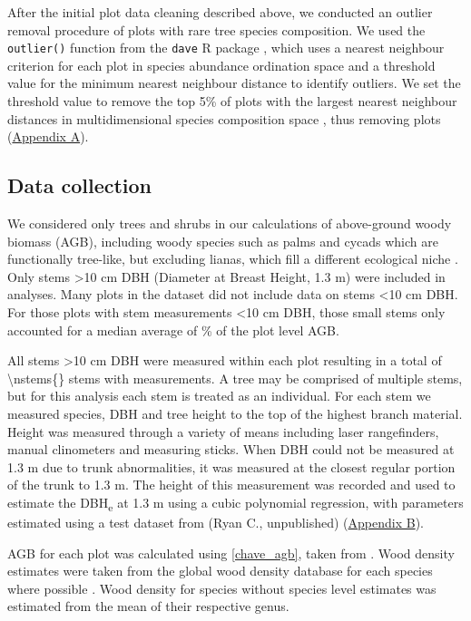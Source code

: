 \documentclass[11pt,a4paper]{article}
\begin{document}
After the initial plot data cleaning described above, we conducted an outlier removal procedure of plots with rare tree species composition. We used the \verb|outlier()| function from the \verb|dave| R package \citep{dave}, which uses a nearest neighbour criterion for each plot in species abundance ordination space and a threshold value for the minimum nearest neighbour distance to identify outliers. We set the threshold value to remove the top 5\% of plots with the largest nearest neighbour distances in multidimensional species composition space \citep{Otto2013}, thus removing \noutliers{} plots (\hyperref[appendixa]{Appendix A}).

\subsection{Data collection}
 
We considered only trees and shrubs in our calculations of above-ground woody biomass (AGB), including woody species such as palms and cycads which are functionally tree-like, but excluding lianas, which fill a different ecological niche \citep{Selaya2008}. Only stems >10 cm DBH (Diameter at Breast Height, 1.3 m) were included in analyses. Many plots in the dataset did not include data on stems <10 cm DBH. For those plots with stem measurements <10 cm DBH, those small stems only accounted for a median average of \percsmallagb{}\% of the plot level AGB. 

All stems >10 cm DBH were measured within each plot resulting in a total of \num[group-separator={,}]{\nstems{}} stems with measurements. A tree may be comprised of multiple stems, but for this analysis each stem is treated as an individual. For each stem we measured species, DBH and tree height to the top of the highest branch material. Height was measured through a variety of means including laser rangefinders, manual clinometers and measuring sticks. When DBH could not be measured at 1.3 m due to trunk abnormalities, it was measured at the closest regular portion of the trunk to 1.3 m. The height of this measurement was recorded and used to estimate the DBH\textsubscript{e} at 1.3 m using a cubic polynomial regression, with parameters estimated using a test dataset from (Ryan C., unpublished) (\hyperref[appendixb]{Appendix B}).

AGB for each plot was calculated using \autoref{chave_agb}, taken from \citet{Chave2014}. Wood density estimates were taken from the global wood density database for each species where possible \citep{Chave2009, Zanne2009}. Wood density for species without species level estimates was estimated from the mean of their respective genus. 
\end{document}

